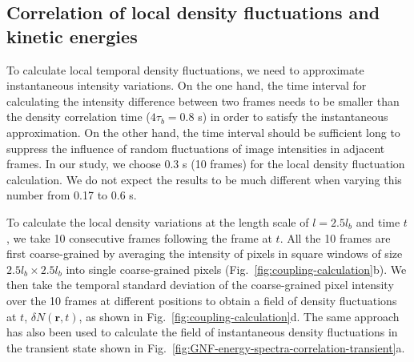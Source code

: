 \documentclass[twocolumn,aps,prx,amsmath,amssymb,longbibliography]{revtex4-2}
\begin{document}
\subsection{Correlation of local density fluctuations and kinetic energies} \label{appendix-IA-localcorrelation}

To calculate local temporal density fluctuations, we need to approximate instantaneous intensity variations. On the one hand, the time interval for calculating the intensity difference between two frames needs to be smaller than the density correlation time ($4\tau_b = 0.8$ s) in order to satisfy the instantaneous approximation. On the other hand, the time interval should be sufficient long to suppress the influence of random fluctuations of image intensities in adjacent frames. In our study, we choose 0.3 s (10 frames) for the local density fluctuation calculation. We do not expect the results to be much different when varying this number from 0.17 to 0.6 s.

To calculate the local density variations at the length scale of $l = 2.5l_b$ and time $t$, we take 10 consecutive frames following the frame at $t$. All the 10 frames are first coarse-grained by averaging the intensity of pixels in square windows of size $2.5l_b \times 2.5l_b$ into single coarse-grained pixels (Fig.~\ref{fig:coupling-calculation}b). We then take the temporal standard deviation of the coarse-grained pixel intensity over the 10 frames at different positions to obtain a field of density fluctuations at $t$, $\delta N(\bm{r},t)$, as shown in Fig.~\ref{fig:coupling-calculation}d. The same approach has also been used to calculate the field of instantaneous density fluctuations in the transient state shown in Fig.~\ref{fig:GNF-energy-spectra-correlation-transient}a.
\end{document}

